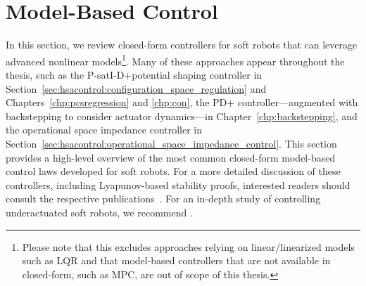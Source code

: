 \section{Model-Based Control}\label{sec:background:model_based_control}
In this section, we review closed-form controllers for soft robots that can leverage advanced nonlinear models\footnote{Please note that this excludes approaches relying on linear/linearized models such as \gls{LQR} and that model-based controllers that are not available in closed-form, such as \gls{MPC}, are out of scope of this thesis.}. Many of these approaches appear throughout the thesis, such as the P-satI-D+potential shaping controller in Section~\ref{sec:hsacontrol:configuration_space_regulation} and Chapters~\ref{chp:pcsregression} and \ref{chp:con}, the PD+ controller—augmented with backstepping to consider actuator dynamics—in Chapter~\ref{chp:backstepping}, and the operational space impedance controller in Section~\ref{sec:hsacontrol:operational_space_impedance_control}. This section provides a high-level overview of the most common closed-form model-based control laws developed for soft robots. For a more detailed discussion of these controllers, including Lyapunov-based stability proofs, interested readers should consult the respective publications~\citep{della2020model, pustina2022feedback, pustina2022p, borja2022energy, della2023model}. For an in-depth study of controlling underactuated soft robots, we recommend \citet{pustina2025analysis}.

